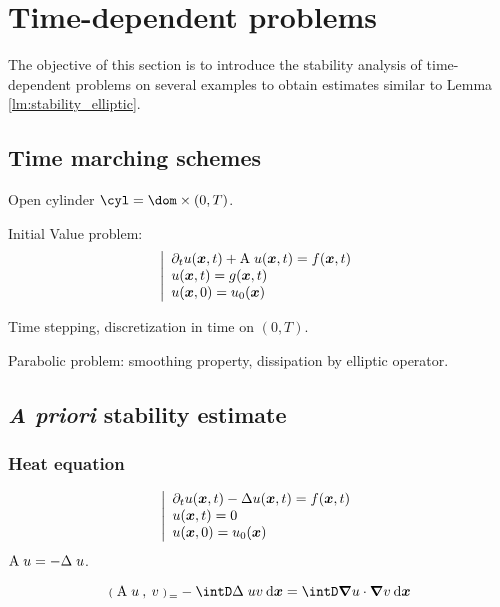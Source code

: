 
\chapter{Time-dependent problems}

The objective of this section is to introduce the \apriori stability analysis of time-dependent problems on several examples to obtain estimates similar to Lemma \ref{lm:stability_elliptic}.

\section{Time marching schemes}

Open cylinder $\cyl = \dom \times (0,T)$.

Initial Value problem:
\begin{equation*}
\left\lvert
\begin{array}{l}
\partial_t u({{\boldsymbol x}},t) + {\mathrm A}\;u({{\boldsymbol x}},t) = f({{\boldsymbol x}},t) \\
u({{\boldsymbol x}},t) = g({{\boldsymbol x}},t) \\
u({{\boldsymbol x}},0) = u_0({{\boldsymbol x}})
\end{array}
\right.
\end{equation*}

Time stepping, discretization in time on $(0,T)$.

Parabolic problem: smoothing property, dissipation by elliptic operator.

\section{\textit{A priori} stability estimate}

\subsection{Heat equation}

\begin{equation*}
\left\lvert
\begin{array}{l}
\partial_t u({{\boldsymbol x}},t) - \Delta u({{\boldsymbol x}},t) = f({{\boldsymbol x}},t) \\
u({{\boldsymbol x}},t) = 0 \\
u({{\boldsymbol x}},0) = u_0({{\boldsymbol x}})
\end{array}
\right.
\end{equation*}
${\mathrm A}\;u = - \Delta\;u$.

\begin{equation*}
\InnerP{\matA\;u}{v} = - \intD \Delta\;u v \dxx = \intD \Grad u \cdot \Grad v \dxx
\end{equation*}

